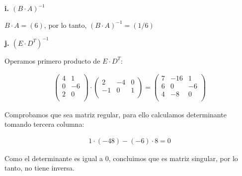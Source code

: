 \documentclass[11pt]{article}
\begin{document}
\textbf{i. \((B\cdot A)^{-1}\)}

\(B\cdot A = (6)\),
por lo tanto,
\((B\cdot A)^{-1}=\boxed{(1/6)}\)

\textbf{j. \((E\cdot D^{T})^{-1}\)}

Operamos primero producto de \(E \cdot D^{T}\):

\begin{align*}
  \begin{pmatrix}
    4 & 1  \\
    0 & -6 \\
    2 & 0  \\
  \end{pmatrix}
  \cdot
  \begin{pmatrix}
    2  & -4 & 0 \\
    -1 & 0  & 1 \\
  \end{pmatrix}
  =
  \begin{pmatrix}
    7 & -16 & 1  \\
    6 & 0   & -6 \\
    4 & -8  & 0  \\
  \end{pmatrix}
\end{align*}

Comprobamos que sea matriz regular,
para ello calculamos determinante tomando tercera columna:

\begin{align*}
  1 \cdot (-48) - (-6) \cdot 8 = \boxed{0}
\end{align*}

Como el determinante es igual a 0,
concluimos que es matriz singular, 
por lo tanto, no tiene inversa.
\end{document}
